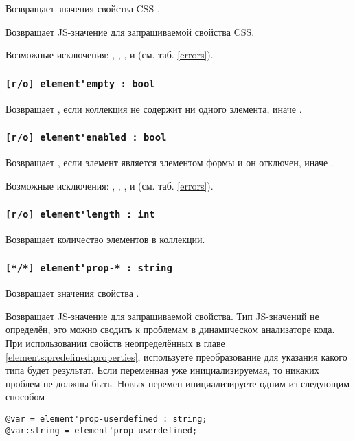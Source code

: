 \code{[w3c]} Возвращает значения свойства CSS \code{*}.

\code{[icL]} Возвращает JS-значение для запрашиваемой свойства CSS.

Возможные исключения: , , ,  и  (см. таб. \ref{errors}).

\subsubsection{\lstinline|[r/o] element'empty : bool|}

Возвращает \true, если коллекция не содержит ни одного элемента, иначе \false.

\subsubsection{\lstinline|[r/o] element'enabled : bool|}

Возвращает \false, если элемент является элементом формы и он отключен, иначе \true. 

Возможные исключения: , , ,  и  (см. таб. \ref{errors}).

\subsubsection{\lstinline|[r/o] element'length : int|}

Возвращает количество элементов в коллекции.

\subsubsection{\lstinline|[*/*] element'prop-* : string|}

\code{[w3c]} Возвращает значения свойства \code{*}.

\code{[icL]}  Возвращает JS-значение для запрашиваемой свойства. Тип JS-значений не определён, это можно сводить к проблемам в динамическом анализаторе кода. При использовании свойств неопределённых в главе \ref{elements:predefined:properties}, используете преобразование для указания какого типа будет результат. Если переменная уже инициализируемая, то никаких проблем не должны быть. Новых перемен инициализируете одним из следующим способом -
\begin{lstlisting}[numbers=none]
@var = element'prop-userdefined : string;
@var:string = element'prop-userdefined;
\end{lstlisting}

